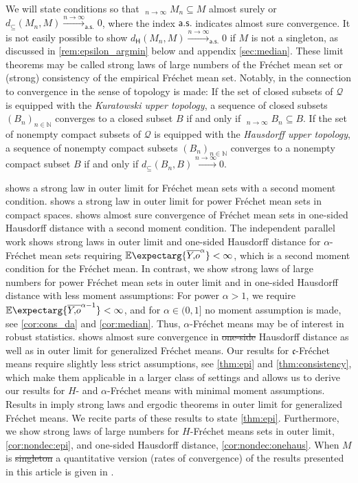 \documentclass{scrartcl}
\renewcommand{\subset}{\subseteq}
\newcommand{\Ex}{\E\expectarg}
\newcommand*{\ms}[1]{\mathsf{#1}}
\newcommand*{\mf}[1]{\mathfrak{#1}}
\newcommand{\N}{\mathbb{N}}
\DeclareMathOperator*{\outerlim}{lim\, \overline{sup}}
\def\MS{\mathcal{Q}}\def\epi{\mathsf{epi}}\def\aec{\mathsf{aec}}\def\alsec{\mathsf{alsec}}\def\aecp{\mathsf{aec}_P}\def\Hausdorff{\mathsf{H}}\def\Haus{\mathsf{H}}\def\ubs{\mathsf{ubs}}\newcommand{\epiconv}[1]{\xrightarrow{#1\to\infty}_\epi}\newcommand{\hausconv}[1]{\xrightarrow{#1\to\infty}_\Hausdorff}\newcommand{\ubsconv}[1]{\xrightarrow{#1\to\infty}_\ubs}\newcommand{\ol}[2]{\overline{#1,\!#2}}
\theoremstyle{plain}\newtheorem{theorem}{Theorem}[section]
\theoremstyle{definition}
\theoremstyle{remark}
\providecommand{\DIFaddtex}[1]{{\protect\color{blue}\uwave{#1}}} %
\providecommand{\DIFdeltex}[1]{{\protect\color{red}\sout{#1}}}                      %
\providecommand{\DIFaddbegin}{} %
\providecommand{\DIFaddend}{} %
\providecommand{\DIFdelbegin}{} %
\providecommand{\DIFdelend}{} %
\providecommand{\DIFadd}[1]{\texorpdfstring{\DIFaddtex{#1}}{#1}} %
\providecommand{\DIFdel}[1]{\texorpdfstring{\DIFdeltex{#1}}{}} %
\newcommand{\DIFscaledelfig}{0.5}
\newlength{\DIFdelgraphicswidth} %
\newlength{\DIFdelgraphicsheight} %
\newcommand{\DIFaddincludegraphics}[2][]{{\color{blue}\fbox{\DIFOincludegraphics[#1]{#2}}}} %
\newcommand{\DIFdelincludegraphics}[2][]{%
\sbox{\DIFdelgraphicsbox}{\DIFOincludegraphics[#1]{#2}}%
\settoboxwidth{\DIFdelgraphicswidth}{\DIFdelgraphicsbox} %
\settoboxtotalheight{\DIFdelgraphicsheight}{\DIFdelgraphicsbox} %
\scalebox{\DIFscaledelfig}{%
\parbox[b]{\DIFdelgraphicswidth}{\usebox{\DIFdelgraphicsbox}\\[-\baselineskip] \rule{\DIFdelgraphicswidth}{0em}}\llap{\resizebox{\DIFdelgraphicswidth}{\DIFdelgraphicsheight}{%
\setlength{\unitlength}{\DIFdelgraphicswidth}%
\begin{picture}(1,1)%
\thicklines\linethickness{2pt} %
{\color[rgb]{1,0,0}\put(0,0){\framebox(1,1){}}}%
{\color[rgb]{1,0,0}\put(0,0){\line( 1,1){1}}}%
{\color[rgb]{1,0,0}\put(0,1){\line(1,-1){1}}}%
\end{picture}%
}\hspace*{3pt}}} %
} %
\DeclareRobustCommand{\DIFaddbegin}{\DIFOaddbegin \let\includegraphics\DIFaddincludegraphics} %
\DeclareRobustCommand{\DIFaddend}{\DIFOaddend \let\includegraphics\DIFOincludegraphics} %
\DeclareRobustCommand{\DIFdelbegin}{\DIFOdelbegin \let\includegraphics\DIFdelincludegraphics} %
\DeclareRobustCommand{\DIFdelend}{\DIFOaddend \let\includegraphics\DIFOincludegraphics} %
\begin{document}
We will state conditions so that $\outerlim_{n\to\infty} M_n \subset M$ almost surely or $d_\subset(M_n, M) \xrightarrow{n\to\infty}_{\ms{a.s.}} 0$, where the index $\ms{a.s.}$ indicates almost sure convergence. It is not easily possible to show $d_\Hausdorff(M_n, M) \xrightarrow{n\to\infty}_{\ms{a.s.}} 0$ if $M$ is not a singleton, as discussed in \autoref{rem:epsilon_argmin} below and appendix \ref{sec:median}. These limit theorems may be called strong laws of large numbers of the Fréchet mean set or (strong) consistency of the empirical Fréchet mean set. Notably, in \cite{evans20} the connection to convergence in the sense of topology is made:
If the set of closed subsets of $\MS$ is equipped with the \textit{Kuratowski upper topology}, a sequence of closed subsets $(B_n)_{n\in\N}$ converges to a closed subset $B$ if and only if $\outerlim_{n\to\infty} B_n \subset B$. 
If the set of nonempty compact subsets of $\MS$ is equipped with the \textit{Hausdorff upper topology}, a sequence of nonempty compact subsets $(B_n)_{n\in\N}$ converges to a nonempty compact subset $B$ if and only if $d_{\subset}(B_n, B)\xrightarrow{n\to\infty} 0$. 

\cite{ziezold77} shows a strong law in outer limit for Fréchet mean sets with a second moment condition.
\cite{sverdrup81} shows a strong law in outer limit for power Fréchet mean sets in compact spaces.
\cite{bhattacharya03} shows almost sure convergence of Fréchet mean sets in one-sided Hausdorff distance with a second moment condition.
The independent parallel work \cite{evans20} shows strong laws in outer limit and one-sided Hausdorff distance for $\alpha$-Fréchet mean sets requiring $\Ex{\ol Yo^{\alpha}} < \infty$, which is a second moment condition for the Fréchet mean.
In contrast, we show strong laws of large numbers for power Fréchet mean sets in outer limit and in one-sided Hausdorff distance with less moment assumptions: For power $\alpha>1$, we require $\Ex{\ol Yo^{\alpha-1}} < \infty$, and for $\alpha\in (0,1]$ no moment assumption is made, see \autoref{cor:cons_da} and \autoref{cor:median}. Thus, $\alpha$-Fréchet means may be of interest in robust statistics.
\cite{huckemann11} shows almost sure convergence in \DIFdelbegin \DIFdel{one-side }\DIFdelend \DIFaddbegin \DIFadd{one-sided }\DIFaddend Hausdorff distance as well as in outer limit for generalized Fréchet means. Our results for $\mf c$-Fréchet means require slightly less strict assumptions, see \autoref{thm:epi} and \autoref{thm:consistency}, which make them applicable in a larger class of settings and allows us to derive our results for $H$- and $\alpha$-Fréchet means with minimal moment assumptions.
Results in \cite{artstein95, korf01, choirat03} imply strong laws and ergodic theorems in outer limit for generalized Fréchet means. We recite parts of these results to state \autoref{thm:epi}.
Furthermore, we show strong laws of large numbers for $H$-Fréchet means sets in outer limit, \autoref{cor:nondec:epi}, and one-sided Hausdorff distance, \autoref{cor:nondec:onehaus}.
When $M$ is \DIFdelbegin \DIFdel{singleton }\DIFdelend \DIFaddbegin \DIFadd{a singleton, }\DIFaddend a quantitative version (rates of convergence) of the results presented in this article is given in \cite{schoetz19}.
\end{document}
